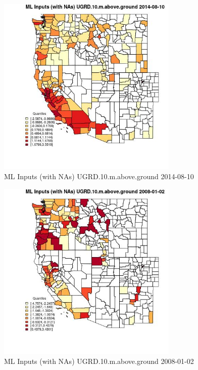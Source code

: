 \begin{figure} 
\centering  
\includegraphics[width=0.77\textwidth]{Code_Outputs/Report_ML_input_PM25_Step4_part_e_de_duplicated_aves_compiled_2019-05-18wNAs_CountyUGRD10mabovegroundMean2014-08-10_2014-08-10.jpg} 
\caption{\label{fig:Report_ML_input_PM25_Step4_part_e_de_duplicated_aves_compiled_2019-05-18wNAsCountyUGRD10mabovegroundMean2014-08-10_2014-08-10}ML Inputs (with NAs) UGRD.10.m.above.ground 2014-08-10} 
\end{figure} 
 

\begin{figure} 
\centering  
\includegraphics[width=0.77\textwidth]{Code_Outputs/Report_ML_input_PM25_Step4_part_e_de_duplicated_aves_compiled_2019-05-18wNAs_CountyUGRD10mabovegroundMean2008-01-02_2008-01-02.jpg} 
\caption{\label{fig:Report_ML_input_PM25_Step4_part_e_de_duplicated_aves_compiled_2019-05-18wNAsCountyUGRD10mabovegroundMean2008-01-02_2008-01-02}ML Inputs (with NAs) UGRD.10.m.above.ground 2008-01-02} 
\end{figure} 
 

